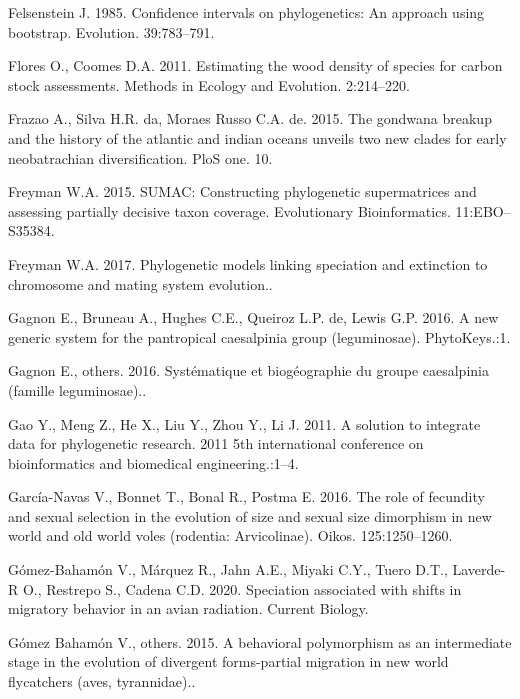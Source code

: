 \documentclass[]{article}
\begin{document}
\leavevmode\hypertarget{ref-felsenstein1985confidence}{}%
Felsenstein J. 1985. Confidence intervals on phylogenetics: An approach using bootstrap. Evolution. 39:783--791.

\leavevmode\hypertarget{ref-flores2011estimating}{}%
Flores O., Coomes D.A. 2011. Estimating the wood density of species for carbon stock assessments. Methods in Ecology and Evolution. 2:214--220.

\leavevmode\hypertarget{ref-frazao2015gondwana}{}%
Frazao A., Silva H.R. da, Moraes Russo C.A. de. 2015. The gondwana breakup and the history of the atlantic and indian oceans unveils two new clades for early neobatrachian diversification. PloS one. 10.

\leavevmode\hypertarget{ref-freyman2015sumac}{}%
Freyman W.A. 2015. SUMAC: Constructing phylogenetic supermatrices and assessing partially decisive taxon coverage. Evolutionary Bioinformatics. 11:EBO--S35384.

\leavevmode\hypertarget{ref-freyman2017phylogenetic}{}%
Freyman W.A. 2017. Phylogenetic models linking speciation and extinction to chromosome and mating system evolution..

\leavevmode\hypertarget{ref-gagnon2016new}{}%
Gagnon E., Bruneau A., Hughes C.E., Queiroz L.P. de, Lewis G.P. 2016. A new generic system for the pantropical caesalpinia group (leguminosae). PhytoKeys.:1.

\leavevmode\hypertarget{ref-gagnon2016systematique}{}%
Gagnon E., others. 2016. Systématique et biogéographie du groupe caesalpinia (famille leguminosae)..

\leavevmode\hypertarget{ref-gao2011solution}{}%
Gao Y., Meng Z., He X., Liu Y., Zhou Y., Li J. 2011. A solution to integrate data for phylogenetic research. 2011 5th international conference on bioinformatics and biomedical engineering.:1--4.

\leavevmode\hypertarget{ref-garcia2016role}{}%
García-Navas V., Bonnet T., Bonal R., Postma E. 2016. The role of fecundity and sexual selection in the evolution of size and sexual size dimorphism in new world and old world voles (rodentia: Arvicolinae). Oikos. 125:1250--1260.

\leavevmode\hypertarget{ref-gomez2020speciation}{}%
Gómez-Bahamón V., Márquez R., Jahn A.E., Miyaki C.Y., Tuero D.T., Laverde-R O., Restrepo S., Cadena C.D. 2020. Speciation associated with shifts in migratory behavior in an avian radiation. Current Biology.

\leavevmode\hypertarget{ref-gomez2015behavioral}{}%
Gómez Bahamón V., others. 2015. A behavioral polymorphism as an intermediate stage in the evolution of divergent forms-partial migration in new world flycatchers (aves, tyrannidae)..
\end{document}

